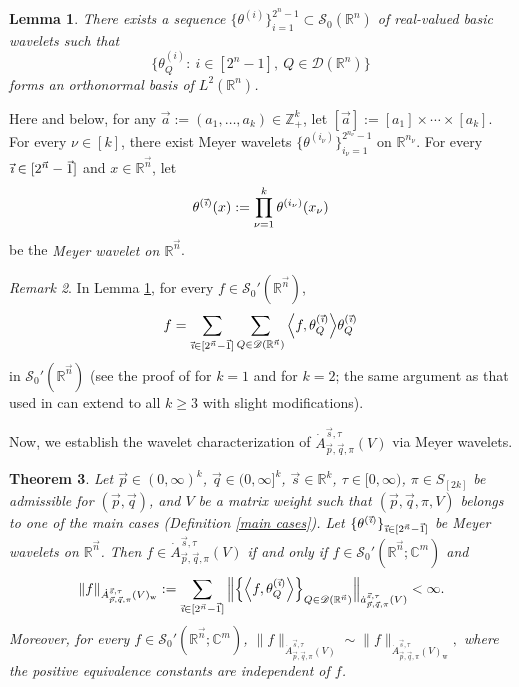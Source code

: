 \documentclass[11pt, reqno]{amsart}
\newtheorem{theorem}{Theorem}[section]
\newtheorem{lemma}[theorem]{Lemma}
\theoremstyle{definition}
\theoremstyle{remark}
\newtheorem{remark}[theorem]{Remark}
\numberwithin{equation}{section}
\newcommand{\C}{\mathbb C}
\newcommand{\R}{\mathbb R}
\newcommand{\vi}{\vec{\textit{\i}}}
\newcommand{\vn}{\vec n}
\newcommand{\vp}{\vec p}
\newcommand{\vq}{\vec q}
\newcommand{\vs}{\vec s}
\begin{document}
\begin{lemma}\label{wavelet basis}
There exists a sequence $\{\theta^{(i)}\}_{i=1}^{2^n-1}\subset\mathscr{S}_0(\R^n)$
of real-valued basic wavelets such that
$$
\Big\{\theta^{(i)}_Q:\ i\in [2^n-1],\ Q\in\mathscr{D}(\R^n)\Big\}
$$
forms an orthonormal basis of $L^2(\R^n)$.
\end{lemma}

Here and below, for any $\vec a:=(a_1,\ldots,a_k)\in\mathbb Z^k_+$,
let $[\vec a]:=[a_1]\times\cdots\times[a_k]$.
For every $\nu\in[k]$,
there exist Meyer wavelets
$\{\theta^{(i_\nu)}\}_{i_\nu=1}^{2^{n_\nu}-1}$ on $\R^{n_\nu}$.
For every $\vi\in[2^{\vn}-\vec1]$
and $x\in \mathbb R^{\vec n}$, let
$$
\theta^{(\vi)}(x)
:=\prod_{\nu=1}^k \theta^{(i_\nu)}(x_\nu)
$$
be the \emph{Meyer wavelet on $\R^{\vn}$}.

\begin{remark}\label{121}
In Lemma \ref{wavelet basis}, for every $f\in\mathscr{S}_0'(\R^{\vn})$,
\begin{equation*}
f=\sum_{\vi\in[2^{\vn}-\vec1]}\sum_{Q\in\mathscr{D}(\R^{\vn})}
\Big\langle f,\theta^{(\vi)}_Q\Big\rangle\theta^{(\vi)}_Q
\end{equation*}
in $\mathscr{S}_0'(\R^{\vn})$
(see the proof of \cite[Theorem 7.20]{FJW91} for $k=1$ and
\cite[Proposition 6.2]{GKP21} for $k=2$;
the same argument as that used in \cite[Proposition 6.2]{GKP21} can extend to all $k\geq 3$ with slight modifications).
\end{remark}

Now, we establish the wavelet characterization of
$\dot A^{\vec s,\tau}_{\vec p,\vec q,\pi}(V)$
via Meyer wavelets.

\begin{theorem}\label{wavelet}
Let $\vp\in(0,\infty)^k$, $\vq\in(0,\infty]^k$, $\vs\in\R^k$, $\tau\in[0,\infty)$,
$\pi\in S_{[2k]}$ be admissible for $(\vp,\vq)$,
and $V$ be a matrix weight such that $(\vp,\vq,\pi,V)$ belongs
to one of the main cases (Definition \ref{main cases}).
Let $\{\theta^{(\vi)}\}_{\vi\in[2^{\vn}-\vec1]}$ be Meyer wavelets on $\R^{\vn}$.
Then $f\in\dot A^{\vec s,\tau}_{\vec p,\vec q,\pi}(V)$ if and only if $f\in\mathscr{S}_0'(\R^{\vn};\C^m)$ and
$$
\|f\|_{\dot A^{\vec s,\tau}_{\vec p,\vec q,\pi}(V)_\mathrm{w}}
:=\sum_{\vi\in[2^{\vn}-\vec1]}
\Big\|\Big\{\Big\langle f,\theta^{(\vi)}_Q \Big\rangle
\Big\}_{Q\in\mathscr D(\R^{\vn})}\Big\|_{\dot a^{\vec s,\tau}_{\vec p,\vec q,\pi}(V)}
<\infty.
$$
Moreover, for every $f\in\mathscr{S}_0'(\R^{\vn};\C^m)$,
$\|f\|_{\dot A^{\vec s,\tau}_{\vec p,\vec q,\pi}(V)}
\sim\|f\|_{\dot A^{\vec s,\tau}_{\vec p,\vec q,\pi}(V)_\mathrm{w}},$
where the positive equivalence constants are independent of $f$.
\end{theorem}
\end{document}
